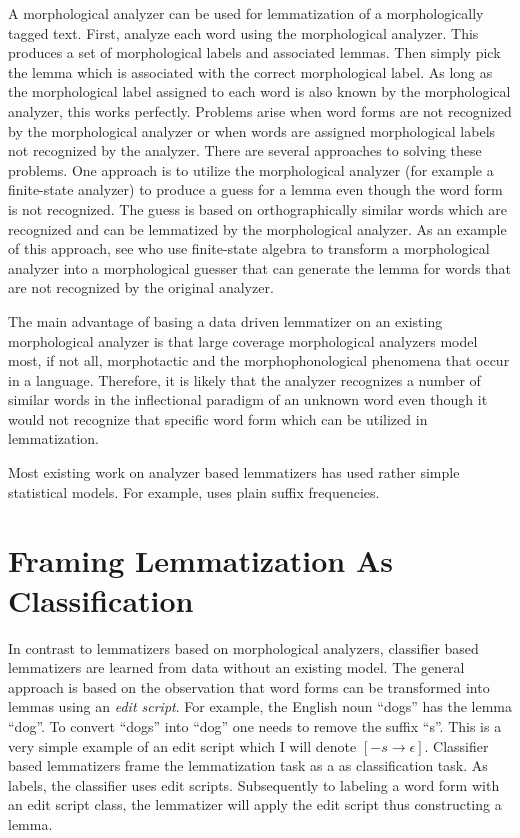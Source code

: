 A morphological analyzer can be used for lemmatization of a
morphologically tagged text. First, analyze each word using the
morphological analyzer. This produces a set of morphological labels
and associated lemmas. Then simply pick the lemma which is associated
with the correct morphological label. As long as the morphological
label assigned to each word is also known by the morphological
analyzer, this works perfectly. Problems arise when word forms are not
recognized by the morphological analyzer or when words are assigned
morphological labels not recognized by the analyzer. There are
several approaches to solving these problems. One approach is to
utilize the morphological analyzer (for example a finite-state
analyzer) to produce a guess for a lemma even though the word form is
not recognized. The guess is based on orthographically similar words
which are recognized and can be lemmatized by the morphological
analyzer. As an example of this approach, see \cite{Linden2009} who
use finite-state algebra to transform a morphological analyzer into a
morphological guesser that can generate the lemma for words that are
not recognized by the original analyzer.

The main advantage of basing a data driven lemmatizer on an existing
morphological analyzer is that large coverage morphological analyzers
model most, if not all, morphotactic and the morphophonological
phenomena that occur in a language. Therefore, it is likely that the
analyzer recognizes a number of similar words in the inflectional paradigm
of an unknown word even though it would not recognize that specific
word form which can be utilized in lemmatization. 

Most existing work on analyzer based lemmatizers has used rather
simple statistical models. For example, \cite{Linden2009} uses plain
suffix frequencies. 

\section{Framing Lemmatization As Classification}

In contrast to lemmatizers based on morphological analyzers,
classifier based lemmatizers \cite{Chrupala2008} are learned from data
without an existing model. The general approach is based on the
observation that word forms can be transformed into lemmas using an
{\it edit script}. For example, the English noun ``dogs'' has the
lemma ``dog''. To convert ``dogs'' into ``dog'' one needs to remove
the suffix ``s''. This is a very simple example of an edit script
which I will denote $[-s \rightarrow \epsilon]$. %
Classifier based lemmatizers frame the lemmatization task as a as
classification task. As labels, the classifier uses edit
scripts. Subsequently to labeling a word form with an edit script
class, the lemmatizer will apply the edit script thus constructing a lemma.

